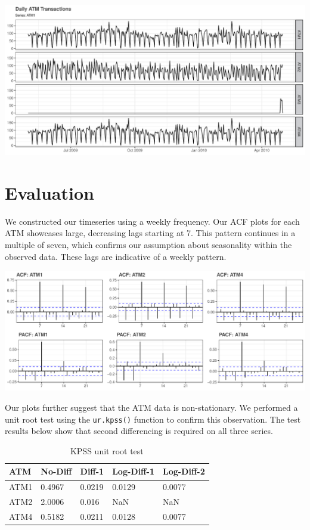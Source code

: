 \documentclass[openany]{book}
\begin{document}
\includegraphics{Part-A-JM_files/figure-latex/unnamed-chunk-3-1.pdf}

\hypertarget{evaluation}{%
\section{Evaluation}\label{evaluation}}

We constructed our timeseries using a weekly frequency. Our ACF plots
for each ATM showcases large, decreasing lags starting at 7. This
pattern continues in a multiple of seven, which confirms our assumption
about seasonality within the observed data. These lags are indicative of
a weekly pattern.

\includegraphics{Part-A-JM_files/figure-latex/unnamed-chunk-4-1.pdf}

Our plots further suggest that the ATM data is non-stationary. We
performed a unit root test using the \texttt{ur.kpss()} function to
confirm this observation. The test results below show that second
differencing is required on all three series.

\begin{table}[H]

\caption{\label{tab:unnamed-chunk-5}KPSS unit root test}
\centering
\begin{tabular}{l|l|l|l|l}
\hline
\textbf{ATM} & \textbf{No-Diff} & \textbf{Diff-1} & \textbf{Log-Diff-1} & \textbf{Log-Diff-2}\\
\hline
\rowcolor{gray!6}  ATM1 & 0.4967 & 0.0219 & 0.0129 & 0.0077\\
\hline
ATM2 & 2.0006 & 0.016 & NaN & NaN\\
\hline
\rowcolor{gray!6}  ATM4 & 0.5182 & 0.0211 & 0.0128 & 0.0077\\
\hline
\end{tabular}
\end{table}
\end{document}
